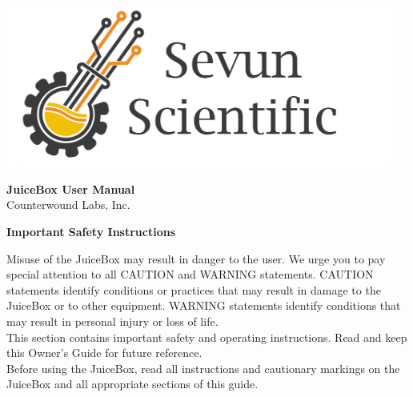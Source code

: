 \documentclass[10pt]{article}
\begin{document}
\date{\today} %
\begin{titlingpage} %
	\centering %
	\includegraphics[width=5in]{ssi_logo.png}
	\vspace{2cm}
\begin{center} %
	\begin{Huge}
		\textbf{JuiceBox User Manual}\\ 
		\vspace{5mm}
		Counterwound Labs, Inc.
	\end{Huge}
\end{center}
\vfill
{\Large \thedate \par} %
\end{titlingpage} 

\begin{flushleft}
	{\huge \textbf{Important Safety Instructions} \par}
	\vspace{1cm}

	\leftskip=3cm %
	\begin{large} 		
		Misuse of the JuiceBox may result in danger to the user. We urge you to
		pay special attention to all CAUTION and WARNING statements.
		CAUTION statements identify conditions or practices that may result in
		damage to the JuiceBox or to other equipment. WARNING statements
		identify conditions that may result in personal injury or loss of life.\\
		\vspace{3mm}
		This section contains important safety and operating instructions. Read
		and keep this Owner’s Guide for future reference.\\
		\vspace{3mm}
		Before using the JuiceBox, read all instructions and
		cautionary markings on the JuiceBox and all appropriate sections of
		this guide.
	\end{large}
\end{flushleft}
\end{document}
